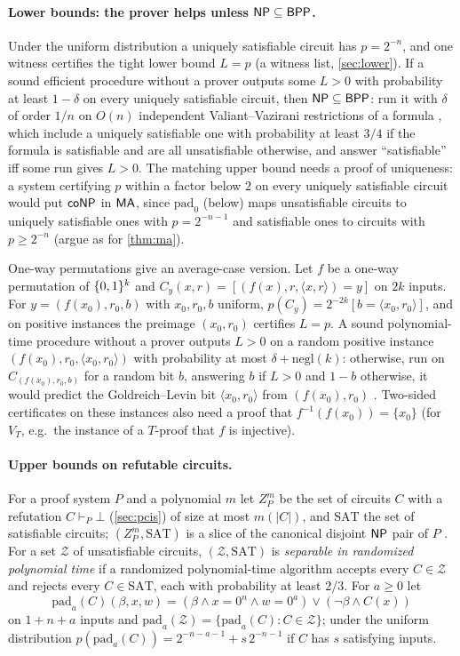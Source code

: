\paragraph{Lower bounds: the prover helps unless $\mathsf{NP}\subseteq\mathsf{BPP}$.}
Under the uniform distribution a uniquely satisfiable circuit has $p=2^{-n}$, and
one witness certifies the tight lower bound $L=p$ (a witness list,
\cref{sec:lower}). If a sound efficient procedure without a prover outputs some
$L>0$ with probability at least $1-\delta$ on every uniquely satisfiable circuit,
then $\mathsf{NP}\subseteq\mathsf{BPP}$: run it with $\delta$ of order $1/n$ on $O(n)$ independent
Valiant--Vazirani restrictions of a formula \cite{vv1986}, which include a uniquely
satisfiable one with probability at least $3/4$ if the formula is satisfiable and
are all unsatisfiable otherwise, and answer ``satisfiable'' iff some run gives
$L>0$. The matching upper bound needs a proof of uniqueness: a system certifying
$p$ within a factor below $2$ on every uniquely satisfiable circuit would put
$\mathsf{coNP}$ in $\mathsf{MA}$, since $\mathrm{pad}_0$ (below) maps unsatisfiable circuits to
uniquely satisfiable ones with $p=2^{-n-1}$ and satisfiable ones to circuits with
$p\ge2^{-n}$ (argue as for \cref{thm:ma}).

One-way permutations give an average-case version. Let $f$ be a one-way
permutation of $\{0,1\}^k$ and $C_y(x,r)=[(f(x),r,\langle x,r\rangle)=y]$ on $2k$
inputs. For $y=(f(x_0),r_0,b)$ with $x_0,r_0,b$ uniform,
$p(C_y)=2^{-2k}[b=\langle x_0,r_0\rangle]$, and on positive instances the preimage
$(x_0,r_0)$ certifies $L=p$. A sound polynomial-time procedure without a prover
outputs $L>0$ on a random positive instance $(f(x_0),r_0,\langle x_0,r_0\rangle)$
with probability at most $\delta+\mathrm{negl}(k)$: otherwise, run on
$C_{(f(x_0),r_0,b)}$ for a random bit $b$, answering $b$ if $L>0$ and $1-b$
otherwise, it would predict the Goldreich--Levin bit $\langle x_0,r_0\rangle$ from
$(f(x_0),r_0)$ \cite{gl1989}. Two-sided certificates on these instances also need a
proof that $f^{-1}(f(x_0))=\{x_0\}$ (for $V_T$, e.g.\ the instance of a $T$-proof that
$f$ is injective).

\paragraph{Upper bounds on refutable circuits.} For a proof system $P$ and a
polynomial $m$ let $Z_P^m$ be the set of circuits $C$ with a refutation
$C\vdash_P\bot$ (\cref{sec:pcis}) of size at most $m(|C|)$, and $\mathrm{SAT}$ the
set of satisfiable circuits; $(Z_P^m,\mathrm{SAT})$ is a slice of the canonical
disjoint $\mathsf{NP}$ pair of $P$ \cite{razborov1994pairs}. For a set $\mathcal Z$ of
unsatisfiable circuits, $(\mathcal Z,\mathrm{SAT})$ is \emph{separable in randomized
polynomial time} if a randomized polynomial-time algorithm accepts every
$C\in\mathcal Z$ and rejects every $C\in\mathrm{SAT}$, each with probability at
least $2/3$. For $a\ge0$ let
\[
\mathrm{pad}_a(C)(\beta,x,w)=(\beta\wedge x=0^n\wedge w=0^a)\vee(\neg\beta\wedge C(x))
\]
on $1+n+a$ inputs and $\mathrm{pad}_a(\mathcal Z)=\{\mathrm{pad}_a(C):C\in\mathcal
Z\}$; under the uniform distribution $p(\mathrm{pad}_a(C))=2^{-n-a-1}+s\,2^{-n-1}$ if
$C$ has $s$ satisfying inputs.

